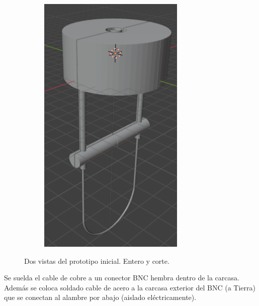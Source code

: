 \begin{figure}[!ht]
\begin{minipage}[c]{0.49\textwidth}
\begin{subfigure}{\textwidth}
			\includegraphics[width=0.76878\textwidth]{Figures/31_04_2025/Modelo_3D_2}
			\captionsetup{width=0.8\textwidth}
			\subcaption{}
		\end{subfigure}
	\end{minipage}
	\caption{Dos vistas del prototipo inicial. Entero y corte.}
	\label{fig:Modelo_3D_prototipo_inicial}
\end{figure}

Se suelda el cable de cobre a un conector BNC hembra dentro de la carcasa. Además se coloca soldado cable de acero a la carcasa exterior del BNC (a Tierra) que se conectan al alambre por abajo (aislado eléctricamente).


